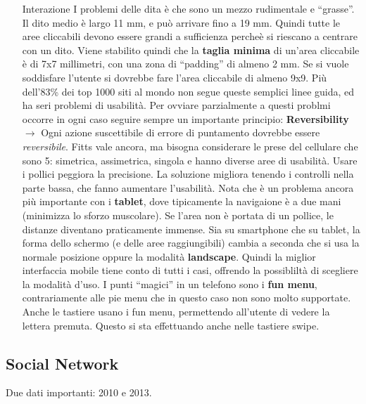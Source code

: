 \begin{enumerate}

\item[Interazione] I problemi delle dita \`e che sono un mezzo rudimentale e ``grasse''. Il dito medio \`e largo 11 mm, e pu\`o arrivare fino a 19 mm. Quindi tutte le aree cliccabili devono essere grandi a sufficienza perche\`e si riescano a centrare con un dito. Viene stabilito quindi che la \textbf{taglia minima} di un'area cliccabile \`e di 7x7 millimetri, con una zona di ``padding'' di almeno 2 mm. Se si vuole soddisfare l'utente si dovrebbe fare l'area cliccabile di almeno 9x9. Pi\`u dell'83\% dei top 1000 siti al mondo non segue queste semplici linee guida, ed ha seri problemi di usabilit\`a. Per ovviare parzialmente a questi problmi occorre in ogni caso seguire sempre un importante principio: \textbf{Reversibility} $\to$ Ogni azione suscettibile di errore di puntamento dovrebbe essere \textit{reversibile}.
  Fitts vale ancora, ma bisogna considerare le prese del cellulare che sono 5: simetrica, assimetrica, singola e hanno diverse aree di usabilit\`a. Usare i pollici peggiora la precisione. La soluzione migliora tenendo i controlli nella parte bassa, che fanno aumentare l'usabilit\`a. Nota che \`e un problema ancora pi\`u importante con i \textbf{tablet}, dove tipicamente la navigaione \`e a due mani (minimizza lo sforzo muscolare). Se l'area non \`e portata di un pollice, le distanze diventano praticamente immense. Sia su smartphone che su tablet, la forma dello schermo (e delle aree raggiungibili) cambia a seconda che si usa la normale posizione oppure la modalit\`a \textbf{landscape}. Quindi la miglior interfaccia mobile tiene conto di tutti i casi, offrendo la possiblilt\`a di scegliere la modalit\`a d'uso. I punti ``magici'' in un telefono sono i \textbf{fun menu}, contrariamente alle pie menu che in questo caso non sono molto supportate. Anche le tastiere usano i fun menu, permettendo all'utente di vedere la lettera premuta. Questo si sta effettuando anche nelle tastiere swipe.

  \end{enumerate}

\subsection{Social Network}

Due dati importanti: 2010 e 2013.

